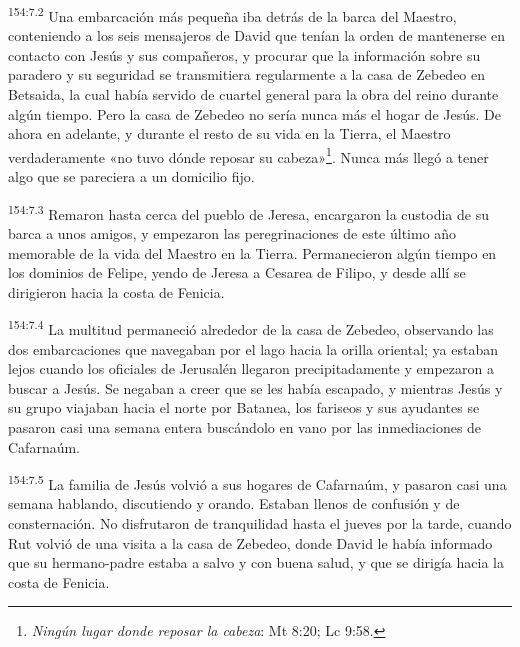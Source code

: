 \par
\textsuperscript{154:7.2} Una embarcación más pequeña iba detrás de la barca del Maestro, conteniendo a los seis mensajeros de David que tenían la orden de mantenerse en contacto con Jesús y sus compañeros, y procurar que la información sobre su paradero y su seguridad se transmitiera regularmente a la casa de Zebedeo en Betsaida, la cual había servido de cuartel general para la obra del reino durante algún tiempo. Pero la casa de Zebedeo no sería nunca más el hogar de Jesús. De ahora en adelante, y durante el resto de su vida en la Tierra, el Maestro verdaderamente «no tuvo dónde reposar su cabeza»\footnote{\textit{Ningún lugar donde reposar la cabeza}: Mt 8:20; Lc 9:58.}. Nunca más llegó a tener algo que se pareciera a un domicilio fijo.

\par
\textsuperscript{154:7.3} Remaron hasta cerca del pueblo de Jeresa, encargaron la custodia de su barca a unos amigos, y empezaron las peregrinaciones de este último año memorable de la vida del Maestro en la Tierra. Permanecieron algún tiempo en los dominios de Felipe, yendo de Jeresa a Cesarea de Filipo, y desde allí se dirigieron hacia la costa de Fenicia.

\par
\textsuperscript{154:7.4} La multitud permaneció alrededor de la casa de Zebedeo, observando las dos embarcaciones que navegaban por el lago hacia la orilla oriental; ya estaban lejos cuando los oficiales de Jerusalén llegaron precipitadamente y empezaron a buscar a Jesús. Se negaban a creer que se les había escapado, y mientras Jesús y su grupo viajaban hacia el norte por Batanea, los fariseos y sus ayudantes se pasaron casi una semana entera buscándolo en vano por las inmediaciones de Cafarnaúm.

\par
\textsuperscript{154:7.5} La familia de Jesús volvió a sus hogares de Cafarnaúm, y pasaron casi una semana hablando, discutiendo y orando. Estaban llenos de confusión y de consternación. No disfrutaron de tranquilidad hasta el jueves por la tarde, cuando Rut volvió de una visita a la casa de Zebedeo, donde David le había informado que su hermano-padre estaba a salvo y con buena salud, y que se dirigía hacia la costa de Fenicia.